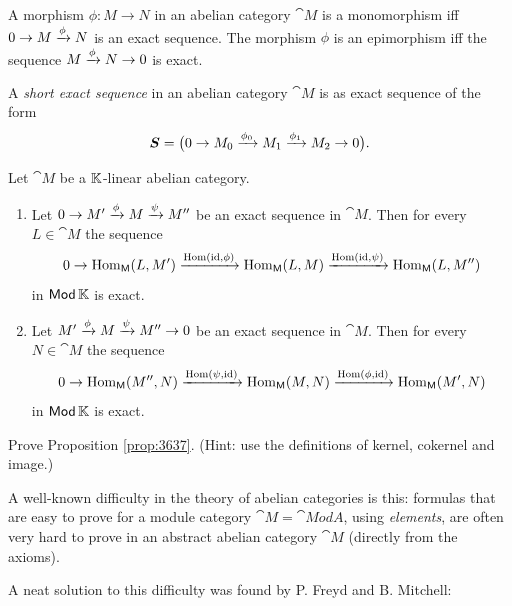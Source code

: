 \begin{exa} \label{exa:3635}
A morphism $\phi : M \to N$ in an abelian category $\cat{M}$ is a monomorphism 
iff $0 \to M \xrightarrow{\phi} N$
is an exact sequence. The morphism $\phi$ is  an epimorphism iff the sequence
$M \xrightarrow{\phi} N \to 0$ is exact. 
\end{exa}

\begin{dfn} \label{dfn:4095}
A {\em short exact sequence} in an abelian category $\cat{M}$ is as exact 
sequence of the form 
\[ \boldsymbol{S} = \bigl( 0 \to M_0 \xrightarrow{\phi_0} M_1 \xrightarrow{\phi_1} M_2 \to 0 \bigr) . 
\] 
\end{dfn}

\begin{prop} \label{prop:3637}
Let $\cat{M}$ be a $\mathbb{K}$-linear abelian category.
\begin{enumerate}
\item Let 
$0 \to M' \xrightarrow{\phi} M \xrightarrow{\psi} M''$
be an exact sequence in $\cat{M}$. Then for every $L \in \cat{M}$ the sequence 
\[ 0 \to \operatorname{Hom}_{\operatorname{\mathsf{M}}}(L, M') \xrightarrow{\operatorname{Hom}(\operatorname{id}, \phi)} 
\operatorname{Hom}_{\operatorname{\mathsf{M}}}(L, M) \xrightarrow{\operatorname{Hom}(\operatorname{id}, \psi)}
\operatorname{Hom}_{\operatorname{\mathsf{M}}}(L, M'') \]
in $\operatorname{\mathsf{Mod}} \mathbb{K}$ is exact. 

\item Let 
$M' \xrightarrow{\phi} M \xrightarrow{\psi} M'' \to 0$
be an exact sequence in $\cat{M}$. Then for every $N \in \cat{M}$ the sequence 
\[ 0 \to \operatorname{Hom}_{\operatorname{\mathsf{M}}}(M'', N) \xrightarrow{\operatorname{Hom}(\psi, \operatorname{id})} 
\operatorname{Hom}_{\operatorname{\mathsf{M}}}(M, N) \xrightarrow{\operatorname{Hom}(\phi, \operatorname{id})}
\operatorname{Hom}_{\operatorname{\mathsf{M}}}(M', N) \]
in $\operatorname{\mathsf{Mod}} \mathbb{K}$ is exact. 
\end{enumerate}
\end{prop}

\begin{exer} \label{exer:3635}
Prove Proposition \ref{prop:3637}. (Hint: use the definitions of kernel, 
cokernel and image.)
\end{exer}

 
\label{subsec:sheaf-tricks}

A well-known difficulty in the theory of abelian categories is this: formulas 
that are easy to prove for a module category 
$\cat{M} = \cat{Mod} A$, using {\em elements}, are often 
very hard to prove in an abstract abelian category $\cat{M}$ (directly from the 
axioms). 

A neat solution to this difficulty was found by P. Freyd and B. Mitchell:

